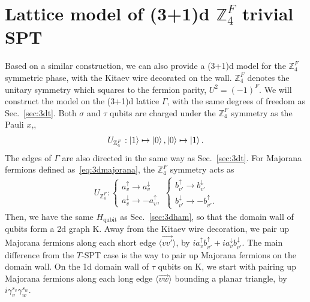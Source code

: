 \documentclass[12pt]{article}
\numberwithin{equation}{section}
\begin{document}
\section{Lattice model of (3+1)d $\mathbb{Z}_4^F$ trivial SPT}
\label{sec:3dz4f}
Based on a similar construction, we can also provide a (3+1)d model for the $\mathbb{Z}_4^F$ symmetric phase, with the Kitaev wire decorated on the wall.
$\mathbb{Z}_4^F$ denotes the unitary symmetry which squares to the fermion parity, $U^2=(-1)^F$.
We will construct the model on the (3+1)d lattice $\Gamma$, with the same degrees of freedom as Sec.~\ref{sec:3dt}. 
Both $\sigma$ and $\tau$ qubits are charged under the $\mathbb{Z}_4^F$ symmetry as the Pauli $x$,,
\begin{align}
    U_{\mathbb{Z}_4^F}: \ket{1}\mapsto\ket{0}, \ket{0}\mapsto\ket{1}.
    \label{eq:z4fqubit}
\end{align}
The edges of $\Gamma$ are also directed in the same way as Sec.~\ref{sec:3dt}. For Majorana fermions defined as~\eqref{eq:3dmajorana}, the $\mathbb{Z}_4^F$ symmetry acts as
\begin{align}
U_{\mathbb{Z}_4^F}:
\begin{cases}
a_v^{\uparrow}\to a_v^{\downarrow}\\
a_v^{\downarrow}\to-a_v^{\uparrow},
\end{cases}
\begin{cases}
b_{v'}^{\uparrow}\to b_{v'}^{\downarrow}\\
b_{v'}^{\downarrow}\to -b_{v'}^{\uparrow}.
\end{cases}
\end{align}
Then, we have the same $H_{\mathrm{qubit}}$ as Sec.~\ref{sec:3dham}, so that the domain wall of qubits form a 2d graph $\mathrm{K}$. Away from the Kitaev wire decoration, we pair up Majorana fermions along each short edge $\langle \overrightarrow{vv'}\rangle$, by $ia_v^{\uparrow}b_{v'}^{\uparrow}+ia_v^{\downarrow}b_{v'}^{\downarrow}$. 
The main difference from the $T$-SPT case is the way to pair up Majorana fermions on the domain wall. On the 1d domain wall of $\tau$ qubits on $\mathrm{K}$, we start with pairing up Majorana fermions along each long edge $\langle \overrightarrow{vw}\rangle$ bounding a planar triangle, by $i\gamma_v^{s_v}\gamma_w^{s_w}$.
\end{document}
